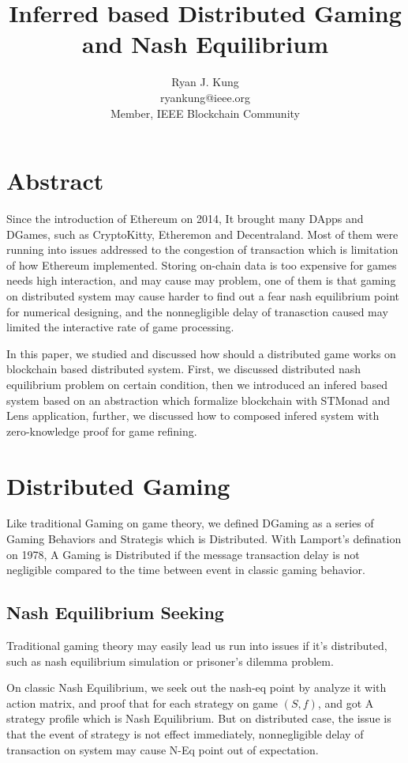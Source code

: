 \documentclass[twocolumn]{article}
\author{Ryan J. Kung \\ryankung@ieee.org\\Member, IEEE Blockchain Community }
\title{Inferred based Distributed Gaming and Nash Equilibrium}
\begin{document}
\maketitle
\section{Abstract}
Since the introduction of Ethereum on 2014\cite{ethereum}, It brought many DApps and DGames, such as CryptoKitty, Etheremon and Decentraland. Most of them were running into issues addressed to the congestion of transaction which is limitation of how Ethereum implemented. Storing on-chain data is too expensive for games needs high interaction, and may cause may problem, one of them is that gaming on distributed system may cause harder to find out a fear nash equilibrium point for numerical designing, and the nonnegligible delay of tranasction caused may limited the interactive rate of game processing.

In this paper, we studied and discussed how should a distributed game works on blockchain based distributed system. First, we discussed distributed nash equilibrium problem on certain condition, then we introduced an infered based system based on an abstraction which formalize blockchain with STMonad and Lens application, further, we discussed how to composed infered system with zero-knowledge proof for game refining.

\section{Distributed Gaming}


Like traditional Gaming on game theory, we defined DGaming as a series of Gaming Behaviors and Strategis which is Distributed. With Lamport's defination on 1978\cite{time-clocks-ordering-events-distributed-system}, A Gaming is Distributed if the message transaction delay is not negligible compared to the time between event in classic gaming behavior.
\subsection{Nash Equilibrium Seeking}
Traditional gaming theory may easily lead us run into issues if it's distributed, such as nash equilibrium simulation or prisoner's dilemma problem.

On classic Nash Equilibrium, we seek out the nash-eq point by analyze it with action matrix, and proof that for each strategy on game $(S, f)$, and got A strategy profile which is Nash Equilibrium. But on distributed case, the issue is that the event of strategy is not effect immediately, nonnegligible delay of transaction on system may cause N-Eq point out of expectation.
\end{document}
